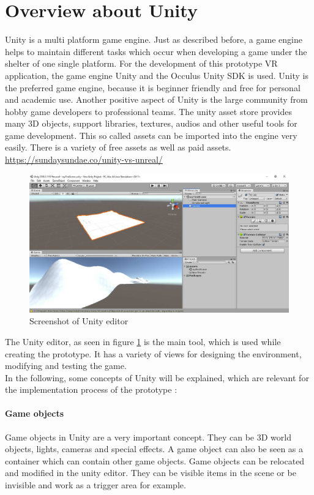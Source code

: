 \section{Overview about Unity}
Unity is a multi platform game engine. Just as described before, a game engine helps to maintain different tasks which occur when developing a game under the shelter of one single platform. 
For the development of this prototype VR application, the game engine Unity and the Occulus Unity SDK is used. Unity is the preferred game engine, because it is beginner friendly and free for personal and academic use. Another positive aspect of Unity is the large community from hobby game developers to professional teams. The unity asset store provides many 3D objects, support libraries, textures, audios and other useful tools for game development. This so called assets can be imported into the engine very easily. There is a variety of free assets as well as paid assets. \url{https://sundaysundae.co/unity-vs-unreal/}\\
\begin{figure}[h!]
  \includegraphics[width=16cm]{kapitel/eps/editor.pdf}
  \centering
  \caption{Screenshot of Unity editor}
  \label{fig:unity-editor}
\end{figure}
The Unity editor, as seen in figure \ref{fig:unity-editor} is the main tool, which is used while creating the prototype. It has a variety of views for designing the environment, modifying and testing the game. \\
In the following, some concepts of Unity will be explained, which are  relevant for the implementation process of the prototype \cite{??}:
\paragraph{Game objects} Game objects in Unity are a very important concept. They can be 3D world objects, lights, cameras and special effects. A game object can also be seen as a container which can contain other game objects. Game objects can be relocated and modified in the unity editor. They can be visible items in the scene or be invisible and work as a trigger area for example.
